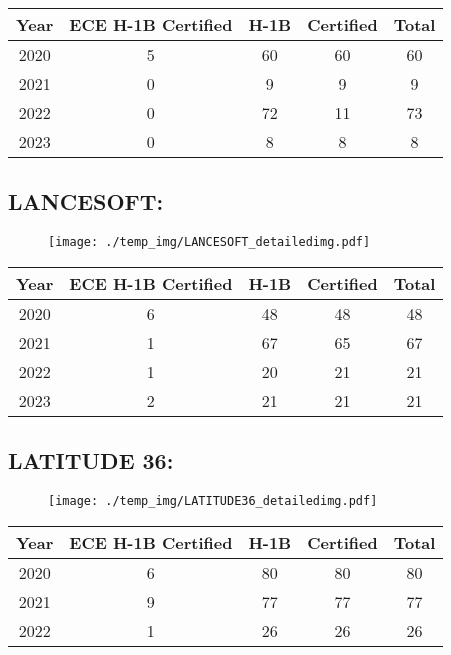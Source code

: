 \documentclass{article}%
\begin{document}
%
\begin{longtable}{c|c|c|c|c}%
\hline%
Year&ECE H{-}1B Certified&H{-}1B&Certified&Total\\%
\hline%
2020&5&60&60&60\\%
\hline%
2021&0&9&9&9\\%
\hline%
2022&0&72&11&73\\%
\hline%
2023&0&8&8&8\\%
\hline%
\end{longtable}

%
\newpage%
\subsection{LANCESOFT:}%
\label{subsec:LANCESOFT}%
\label{LANCESOFTdetailed}%


\begin{figure}[htbp]%
\centering%
\texttt{[image: ./temp\_img/LANCESOFT\_detailedimg.pdf]}%
\end{figure}

%
\begin{longtable}{c|c|c|c|c}%
\hline%
Year&ECE H{-}1B Certified&H{-}1B&Certified&Total\\%
\hline%
2020&6&48&48&48\\%
\hline%
2021&1&67&65&67\\%
\hline%
2022&1&20&21&21\\%
\hline%
2023&2&21&21&21\\%
\hline%
\end{longtable}

%
\newpage%
\subsection{LATITUDE 36:}%
\label{subsec:LATITUDE36}%
\label{LATITUDE36detailed}%


\begin{figure}[htbp]%
\centering%
\texttt{[image: ./temp\_img/LATITUDE36\_detailedimg.pdf]}%
\end{figure}

%
\begin{longtable}{c|c|c|c|c}%
\hline%
Year&ECE H{-}1B Certified&H{-}1B&Certified&Total\\%
\hline%
2020&6&80&80&80\\%
\hline%
2021&9&77&77&77\\%
\hline%
2022&1&26&26&26\\%
\hline%
\end{longtable}
\end{document}
